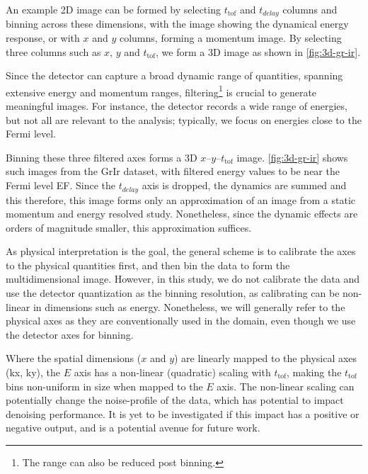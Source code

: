 An example 2D image can be formed by selecting $t_{\text{tof}}$ and $t_{delay}$ columns and binning across these dimensions, with the image showing the dynamical energy response, or with $x$ and $y$ columns, forming a momentum image. By selecting three columns such as $x$, $y$ and $t_{\text{tof}}$, we form a 3D image as shown in \cref{fig:3d-gr-ir}.

Since the detector can capture a broad dynamic range of quantities, spanning extensive energy and momentum ranges, filtering\footnote{The range can also be reduced post binning.} is crucial to generate meaningful images. For instance, the detector records a wide range of energies, but not all are relevant to the analysis; typically, we focus on energies close to the Fermi level. 

Binning these three filtered axes forms a 3D $x$--$y$--$t_{\text{tof}}$ image. \cref{fig:3d-gr-ir} shows such images from the \gls{GrIr} dataset, with filtered energy values to be near the Fermi level \gls{EF}. Since the $t_{delay}$ axis is dropped, the dynamics are summed and this therefore, this image forms only an approximation of an image from a static momentum and energy resolved study. Nonetheless, since the dynamic effects are orders of magnitude smaller, this approximation suffices.

As physical interpretation is the goal, the general scheme is to calibrate the axes to the physical quantities first, and then bin the data to form the multidimensional image. However, in this study, we do not calibrate the data and use the detector quantization as the binning resolution, as calibrating can be non-linear in dimensions such as energy. Nonetheless, we will generally refer to the physical axes as they are conventionally used in the domain, even though we use the detector axes for binning.

Where the spatial dimensions ($x$ and $y$) are linearly mapped to the physical axes (\gls{kx}, \gls{ky}), the $E$ axis has a non-linear (quadratic) scaling with $t_{\text{tof}}$, making the $t_{\text{tof}}$ bins non-uniform in size when mapped to the $E$ axis. The non-linear scaling can potentially change the noise-profile of the data, which has potential to impact denoising performance. It is yet to be investigated if this impact has a positive or negative output, and is a potential avenue for future work.

